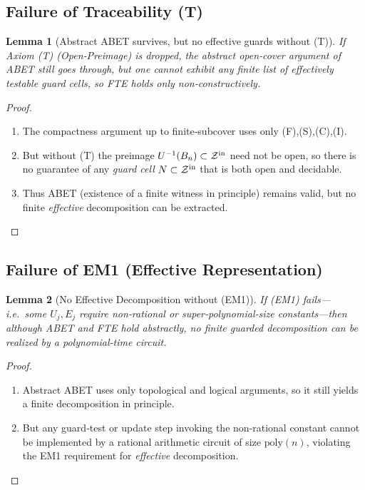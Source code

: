 \documentclass[12pt]{article}
\theoremstyle{definition}
\theoremstyle{plain}
\newtheorem{lemma}{Lemma}[section]
\begin{document}
\subsection{Failure of Traceability (T)}

\begin{lemma}[Abstract ABET survives, but no effective guards without (T)]\label{lem:no-T}
If Axiom (T) (Open‐Preimage) is dropped, the abstract open‐cover argument of
ABET still goes through, but one cannot exhibit any finite list of
\emph{effectively testable} guard cells, so FTE holds only non‐constructively.
\end{lemma}
\begin{proof}
\begin{enumerate}[label=(\arabic*)]
  \item  The compactness argument up to finite‐subcover uses only (F),(S),(C),(I).
  \item  But without (T) the preimage $U^{-1}(B_n)\subset\mathcal Z^{\rm in}$
    need not be open, so there is no guarantee of any \emph{guard cell}
    $N\subset\mathcal Z^{\rm in}$ that is both open and decidable.
  \item  Thus ABET (existence of a finite witness in principle) remains valid,
    but no finite \emph{effective} decomposition can be extracted.
\end{enumerate}
\end{proof}

\subsection{Failure of EM1 (Effective Representation)}

\begin{lemma}[No Effective Decomposition without (EM1)]\label{lem:no-EM1}
If (EM1) fails—i.e.\ some $U_j,E_j$ require non‐rational or super‐polynomial‐size constants—then although ABET and FTE hold abstractly, no finite guarded decomposition can be realized by a polynomial‐time circuit.
\end{lemma}
\begin{proof}
\begin{enumerate}[label=(\arabic*)]
  \item  Abstract ABET uses only topological and logical arguments, so it
    still yields a finite decomposition in principle.
  \item  But any guard‐test or update step invoking the non‐rational constant
    cannot be implemented by a rational arithmetic circuit of size
    $\mathrm{poly}(n)$, violating the EM1 requirement for \emph{effective}
    decomposition.
\end{enumerate}
\end{proof}
\end{document}
